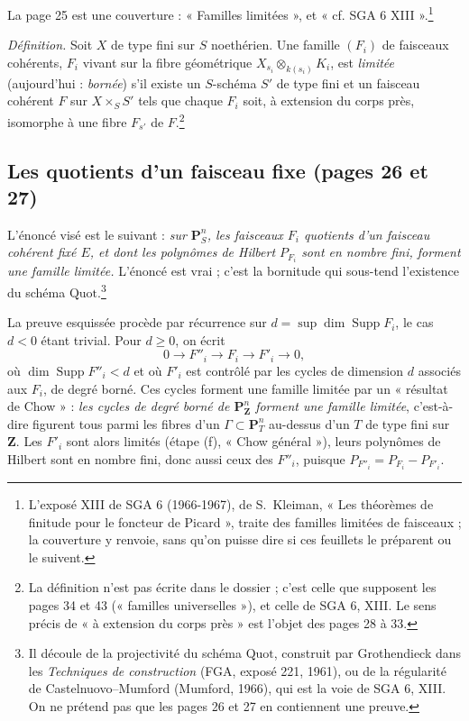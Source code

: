 \documentclass[11pt,a4paper]{article}
\begin{document}
La page 25 est une couverture : « Familles limitées », et
« cf. SGA 6 XIII ».\footnote{L'exposé XIII de SGA 6 (1966-1967), de
S.~Kleiman, « Les théorèmes de finitude pour le foncteur de Picard », traite
des familles limitées de faisceaux ; la couverture y renvoie, sans qu'on
puisse dire si ces feuillets le préparent ou le suivent.}

\emph{Définition.} Soit $X$ de type fini sur $S$ noethérien. Une famille
$(F_i)$ de faisceaux cohérents, $F_i$ vivant sur la fibre géométrique
$X_{s_i} \otimes_{k(s_i)} K_i$, est \emph{limitée} (aujourd'hui :
\emph{bornée}) s'il existe un $S$-schéma $S'$ de type fini et un faisceau
cohérent $F$ sur $X \times_S S'$ tels que chaque $F_i$ soit, à extension du
corps près, isomorphe à une fibre $F_{s'}$ de $F$.\footnote{La définition
n'est pas écrite dans le dossier ; c'est celle que supposent les pages 34 et
43 (« familles universelles »), et celle de SGA 6, XIII. Le sens précis de
« à extension du corps près » est l'objet des pages 28 à 33.}

\subsection*{Les quotients d'un faisceau fixe (pages 26 et 27)}

L'énoncé visé est le suivant : \emph{sur $\mathbf{P}^{n}_{S}$, les
faisceaux $F_i$ quotients d'un faisceau cohérent fixé $E$, et dont les
polynômes de Hilbert $P_{F_i}$ sont en nombre fini, forment une famille
limitée.} L'énoncé est vrai ; c'est la bornitude qui sous-tend
l'existence du schéma $\mathrm{Quot}$.\footnote{Il découle de la
projectivité du schéma $\mathrm{Quot}$, construit par Grothendieck dans les
\emph{Techniques de construction} (FGA, exposé 221, 1961), ou de la
régularité de Castelnuovo--Mumford (Mumford, 1966), qui est la voie de
SGA 6, XIII. On ne prétend pas que les pages 26 et 27 en contiennent une
preuve.}

La preuve esquissée procède par récurrence sur
$d = \sup \dim \operatorname{Supp} F_i$, le cas $d < 0$ étant trivial. Pour
$d \geq 0$, on écrit
\[
  0 \to F''_i \to F_i \to F'_i \to 0,
\]
où $\dim \operatorname{Supp} F''_i < d$ et où $F'_i$ est contrôlé par les
cycles de dimension $d$ associés aux $F_i$, de degré borné. Ces cycles
forment une famille limitée par un « résultat de Chow » : \emph{les cycles
de degré borné de $\mathbf{P}^{n}_{\mathbf{Z}}$ forment une famille
limitée}, c'est-à-dire figurent tous parmi les fibres d'un
$\Gamma \subset \mathbf{P}^{n}_{T}$ au-dessus d'un $T$ de type fini sur
$\mathbf{Z}$. Les $F'_i$ sont alors limités (étape (f), « Chow général »),
leurs polynômes de Hilbert sont en nombre fini, donc aussi ceux des
$F''_i$, puisque $P_{F''_i} = P_{F_i} - P_{F'_i}$.
\end{document}
